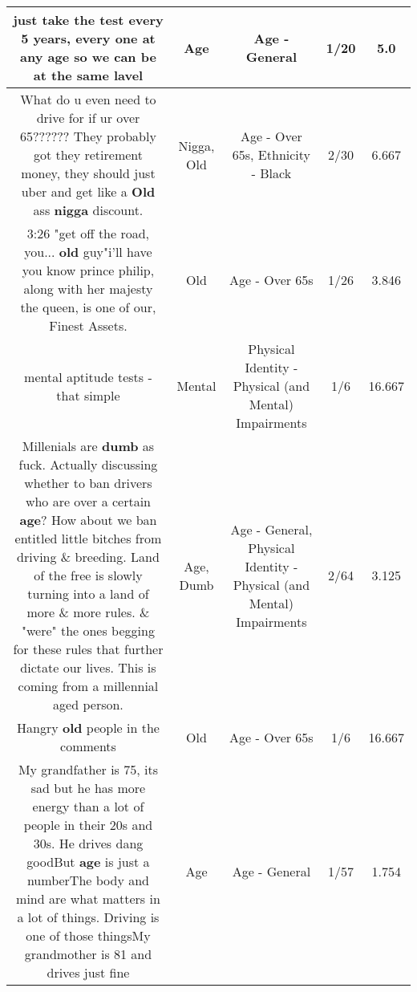 \documentclass[11pt]{article}
\newlength\mylength
\begin{document}
\begin{center}
\begin{longtable}{|C{.65\mylength}|C{.30\mylength}|C{.12\mylength}|C{.12\mylength}|C{.12\mylength}|}
  \small just take the test every 5 years, every one at any \textbf{age} so we can be at the same lavel\normalsize   & Age & Age - General & 1/20 & 5.0 \\  \hline
  \small What do u even need to drive for if ur over 65?????? They probably got they retirement money, they should just uber and get like a \textbf{Old} ass \textbf{nigga} discount.\normalsize   & Nigga, Old & Age - Over 65s, Ethnicity - Black & 2/30 & 6.667 \\  \hline
  \small 3:26 "get off the road, you... \textbf{old} guy"i'll have you know prince philip, along with her majesty the queen, is one of our, Finest Assets.\normalsize   & Old & Age - Over 65s & 1/26 & 3.846 \\  \hline
  \small mental aptitude tests - that simple\normalsize   & Mental & Physical Identity - Physical (and Mental) Impairments & 1/6 & 16.667 \\  \hline
  \small Millenials are \textbf{dumb} as fuck. Actually discussing whether to ban drivers who are over a certain \textbf{age}? How about we ban entitled little bitches from driving \& breeding. Land of the free is slowly turning into a land of more \& more rules. \& "were" the ones begging for these rules that further dictate our lives. This is coming from a millennial aged person.\normalsize   & Age, Dumb & Age - General, Physical Identity - Physical (and Mental) Impairments & 2/64 & 3.125 \\  \hline
  \small Hangry \textbf{old} people in the comments\normalsize   & Old & Age - Over 65s & 1/6 & 16.667 \\  \hline
  \small My grandfather is 75, its sad but he has more energy than a lot of people in their 20s and 30s. He drives dang goodBut \textbf{age} is just a numberThe body and mind are what matters in a lot of things. Driving is one of those thingsMy grandmother is 81 and drives just fine\normalsize   & Age & Age - General & 1/57 & 1.754 \\  \hline

\end{longtable}
\end{center}
\end{document}
